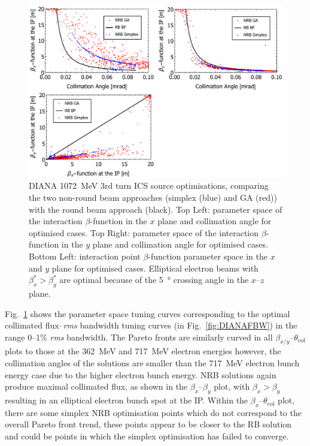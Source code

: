 \documentclass[../main.tex]{subfiles}
\begin{document}
\begin{figure}[!h]
\centering
\includegraphics[width=\textwidth]{Figures/DIANA_Inverse_Compton_Source_Design/DIANA1072param.pdf}
\caption{DIANA 1072~\si{\mega\electronvolt} 3rd turn ICS source optimisations, comparing the two non-round beam approaches (simplex (blue) and GA (red)) with the round beam approach (black). Top Left: parameter space of the interaction $\beta$-function in the $x$ plane and collimation angle for optimised cases. Top Right: parameter space of the interaction $\beta$-function in the $y$ plane and collimation angle for optimised cases. Bottom Left: interaction point $\beta$-function parameter space in the $x$ and $y$ plane for optimised cases. Elliptical electron beams with $\beta_{x}^{*} > \beta_{y}^{*}$ are optimal because of the 5~\si{\degree} crossing angle in the $x$--$z$ plane.}
\label{fig:DIANA1072_param}
\end{figure}
Fig.~\ref{fig:DIANA1072_param} shows the parameter space tuning curves corresponding to the optimal collimated flux--\textit{rms} bandwidth tuning curves (in Fig.~\ref{fig:DIANAFBW}) in the range 0--1\% \textit{rms} bandwidth. The Pareto fronts are similarly curved in all $\beta_{x/y}$--$\theta_{\mathrm{col}}$ plots to those at the 362~\si{\mega\electronvolt} and 717~\si{\mega\electronvolt} electron energies however, the collimation angles of the solutions are smaller than the 717~\si{\mega\electronvolt} electron bunch energy case due to the higher electron bunch energy. NRB solutions again produce maximal collimated flux, as shown in the $\beta_{x}$--$\beta_{y}$ plot, with $\beta_{x}>\beta_{y}$ resulting in an elliptical electron bunch spot at the IP. Within the $\beta_x$--$\theta_{\mathrm{col}}$ plot, there are some simplex NRB optimisation points which do not correspond to the overall Pareto front trend, these points appear to be closer to the RB solution and could be points in which the simplex optimisation has failed to converge. 
\end{document}
